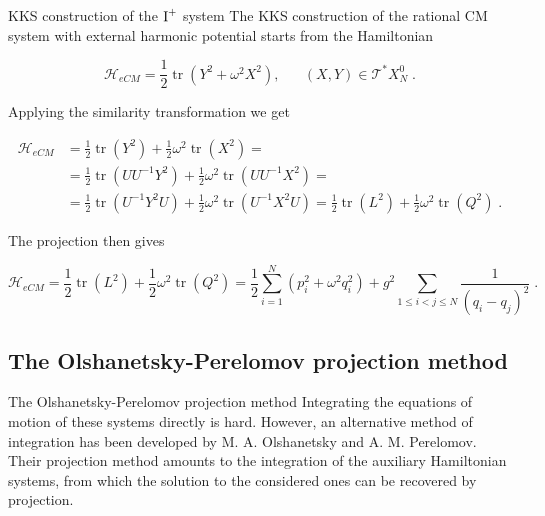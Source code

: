 \documentclass[aspectratio=169, 9pt]{beamer}
\begin{document}
\begin{frame}{KKS construction of the $\textnormal{I}^+$ system}
The KKS construction of the rational CM system with external harmonic potential starts from the Hamiltonian

\begin{equation}
    \mathcal{H}_{eCM} = \frac{1}{2}\operatorname{tr}(Y^2 + \omega^2 X^2), \;\;\;\;\;\;(X,Y) \in \mathcal{T}^\ast X^0_N\;.
\end{equation}

Applying the similarity transformation we get

\begin{equation}
\begin{split}
    \mathcal{H}_{eCM} &= \frac{1}{2}\operatorname{tr}(Y^2) + \frac{1}{2}\omega^2 \operatorname{tr}(X^2) = \\  &= \frac{1}{2}\operatorname{tr}(UU^{-1}Y^2) + \frac{1}{2}\omega^2 \operatorname{tr}(UU^{-1} X^2) = \\ 
    & = \frac{1}{2}\operatorname{tr}(U^{-1} Y^2 U) + \frac{1}{2}\omega^2 \operatorname{tr}(U^{-1} X^2 U)= \frac{1}{2}\operatorname{tr}(L^2) + \frac{1}{2}\omega^2 \operatorname{tr}(Q^2)\;.
\end{split}
\end{equation}

The projection then gives
    
\begin{equation}
    \mathcal{H}_{eCM} = \frac{1}{2}\operatorname{tr}(L^2) + \frac{1}{2}\omega^2 \operatorname{tr}(Q^2)= \frac{1}{2}\sum_{i=1}^N (p_i^2 + \omega^2 q_i^2) + g^2 \sum_{1 \leq i < j \leq N} \frac{1}{(q_i - q_j)^2}\;.
\end{equation}
\end{frame}

\subsection{The Olshanetsky-Perelomov projection method}
\begin{frame}{The Olshanetsky-Perelomov projection method}
Integrating the equations of motion of these systems directly is hard. However, an alternative method of integration has been developed by M. A. Olshanetsky and A. M. Perelomov. Their projection method amounts to the integration of the auxiliary Hamiltonian systems, from which the solution to the considered ones can be recovered by projection.
\end{frame}
\end{document}
